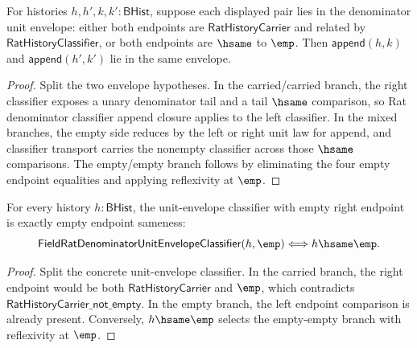 \begin{theorem}
\label{thm:field-rat-denominator-unit-envelope-classifier-append-closed}
For histories $h,h',k,k':\mathsf{BHist}$, suppose each displayed pair lies in
the denominator unit envelope: either both endpoints are
$\mathsf{RatHistoryCarrier}$ and related by $\mathsf{RatHistoryClassifier}$,
or both endpoints are $\hsame$ to $\emp$. Then
$\mathsf{append}(h,k)$ and $\mathsf{append}(h',k')$ lie in the same envelope.
\end{theorem}
\begin{proof}
Split the two envelope hypotheses. In the carried/carried branch, the right
classifier exposes a unary denominator tail and a tail $\hsame$ comparison, so
Rat denominator classifier append closure applies to the left classifier. In
the mixed branches, the empty side reduces by the left or right unit law for
append, and classifier transport carries the nonempty classifier across those
$\hsame$ comparisons. The empty/empty branch follows by eliminating the four
empty endpoint equalities and applying reflexivity at $\emp$.
\end{proof}

\begin{theorem}
\label{thm:field-rat-denominator-unit-envelope-classifier-empty-right-exactness}
For every history $h:\mathsf{BHist}$, the unit-envelope classifier with empty
right endpoint is exactly empty endpoint sameness:
$$
\mathsf{FieldRatDenominatorUnitEnvelopeClassifier}(h,\emp)
\Longleftrightarrow h\hsame\emp.
$$
\end{theorem}
\begin{proof}
Split the concrete unit-envelope classifier. In the carried branch, the right
endpoint would be both $\mathsf{RatHistoryCarrier}$ and $\emp$, which contradicts
$\mathsf{RatHistoryCarrier\_not\_empty}$. In the empty branch, the left endpoint
comparison is already present. Conversely, $h\hsame\emp$ selects the empty-empty
branch with reflexivity at $\emp$.
\end{proof}

